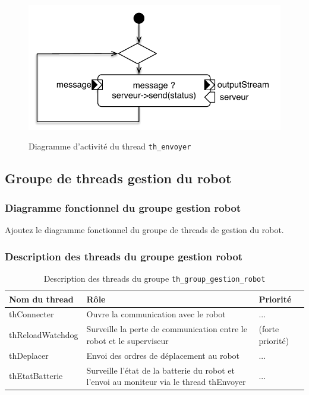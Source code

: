 \documentclass[11pt, a4paper]{paper}
\begin{document}
\begin{figure}[htbp]
\label{fig:act_envoyer}
\begin{center}
{\includegraphics[scale=.5]{./figures-pdf/act_envoyer}}
{\caption{Diagramme d'activité du thread {\tt th\_envoyer}}}
\end{center}
\end{figure}
\FloatBarrier

\subsection{Groupe de threads gestion du robot}

\subsubsection{Diagramme fonctionnel du groupe gestion robot}
{\color{blue} Ajoutez le diagramme fonctionnel du groupe de threads de gestion du robot.}

\subsubsection{Description des threads du groupe gestion robot}



\begin{table}[htp]
\caption{Description des threads du groupe {\tt th\_group\_gestion\_robot}}
\begin{center}
\begin{tabular}{|p{3cm}|p{8.5cm}|p{2cm}|}
\hline
\bf Nom du thread &	\bf Rôle &	\bf Priorité \\
\hline
\hline
\color{black}thConnecter &	\color{black}Ouvre la communication avec le robot &	\color{black}...\\
\hline
\color{black}thReloadWatchdog &	\color{black}Surveille la perte de communication entre le robot et le superviseur &	\color{black}(forte priorité)\\
\hline
\color{black}thDeplacer &	\color{black}Envoi des ordres de déplacement au robot &	\color{black}...\\
\hline
\color{black}thEtatBatterie &	\color{black}Surveille l'état de la batterie du robot et l'envoi au moniteur via le thread thEnvoyer &	\color{black}...\\
\hline
\end{tabular}
\end{center}
\label{tab:gt_moniteur}
\end{table}%
\FloatBarrier
\end{document}
